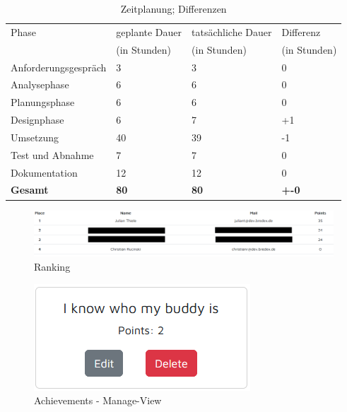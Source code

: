 \documentclass[11pt]{article}
\begin{document}
\begin{table}[H]
    \centering
    \begin{tabular}{|l|l|l|l|}
        \hline
        Phase & geplante Dauer & tatsächliche Dauer & Differenz \\
        & (in Stunden) & (in Stunden) & (in Stunden) \\
        \hline
        Anforderungsgespräch & 3  & 3 &  0 \\
        Analysephase & 6 & 6 &  0 \\
        Planungsphase & 6 & 6 &  0 \\
        Designphase & 6 & 7 & +1 \\
        Umsetzung & 40 & 39 & -1 \\
        Test und Abnahme & 7 & 7 &  0 \\
        Dokumentation & 12 & 12 &  0 \\
        \hline
        \textbf{Gesamt} & \textbf{80} & \textbf{80} & \textbf{+-0} \\
        \hline
    \end{tabular}
    \caption{Zeitplanung; Differenzen}
    \label{table:timediff}
\end{table}

\clearpage

\begin{figure}
    \centering
    \includegraphics[width=\textwidth]{application/ranking_table.png}
    \caption{Ranking}
    \label{abb:ranking}
\end{figure}

\begin{figure}
    \centering
    \includegraphics{application/achievement_manage.png}
    \caption{Achievements - Manage-View}
    \label{abb:achievements_manage}
\end{figure}
\end{document}

